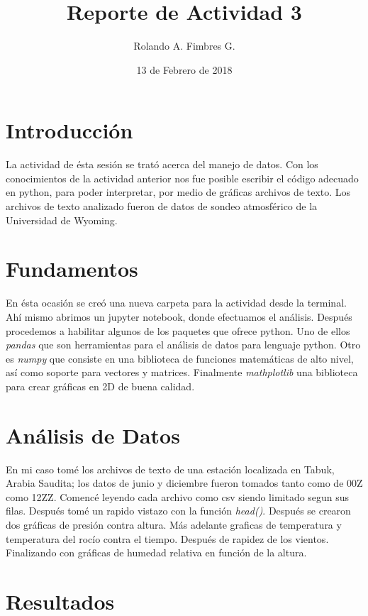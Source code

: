\documentclass{article}
\title{Reporte de Actividad 3}
\author{Rolando A. Fimbres G.}
\date{13 de Febrero de 2018}
\begin{document}
\maketitle
\section{Introducción}
La actividad de ésta sesión se trató acerca del manejo de datos. Con los conocimientos de la actividad anterior nos fue posible escribir el código adecuado en python, para poder interpretar, por medio de gráficas archivos de texto. Los archivos de texto analizado fueron de datos de sondeo atmosférico de la Universidad de Wyoming.
\section{Fundamentos}
En ésta ocasión se creó una nueva carpeta para la actividad desde la terminal. Ahí mismo abrimos un jupyter notebook, donde efectuamos el análisis. Después procedemos a habilitar algunos de los paquetes que ofrece python. Uno de ellos \textit{pandas} que son herramientas para el análisis de datos para lenguaje python. Otro es \textit{numpy} que consiste en una biblioteca de funciones matemáticas de alto nivel, así como soporte para vectores y matrices. Finalmente \textit{mathplotlib} una biblioteca para crear gráficas en 2D de buena calidad.
\section{Análisis de Datos}
En mi caso tomé los archivos de texto de una estación localizada en Tabuk, Arabia Saudita; los datos de junio y diciembre fueron tomados tanto como de 00Z como 12ZZ. Comencé leyendo cada archivo como csv siendo limitado segun sus filas. Después tomé un rapido vistazo con la función \textit{head()}. Después se crearon dos gráficas de presión contra altura. Más adelante graficas de temperatura y temperatura del rocío contra el tiempo. Después de rapidez de los vientos. Finalizando con gráficas de humedad relativa en función de la altura.
\section{Resultados}
\end{document}
